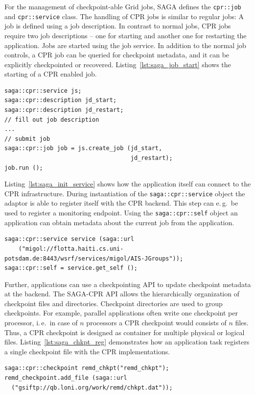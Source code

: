 \documentclass[times, 10pt, twocolumn]{article}
\begin{document}
For the management of checkpoint-able Grid jobs, SAGA defines the \texttt{cpr::job} and \texttt{cpr::service} class. The handling of 
CPR jobs is similar to regular jobs: A job is defined using a job description. In contrast to normal jobs, 
CPR jobs require  two job descriptions -- one for starting and another one for restarting the application.
Jobs are started using the job service. In addition to the normal job controls, a CPR job can be queried for checkpoint metadata, and 
it can be explicitly checkpointed or recovered. Listing~\ref{lst:saga_job_start} shows the starting of a CPR enabled job.


\begin{lstlisting}[style=myListing, caption={\small \bf SAGA-CPR: Starting a Job}, float=t, label={lst:saga_job_start}]
saga::cpr::service js; 
saga::cpr::description jd_start;
saga::cpr::description jd_restart;
// fill out job description
...
// submit job  
saga::cpr::job job = js.create_job (jd_start, 
                                    jd_restart);
job.run ();
\end{lstlisting}

Listing~\ref{lst:saga_init_service} shows how the application itself can connect to the CPR infrastructure. During instantiation of the \texttt{saga::cpr::service} object the adaptor is able to register itself with the CPR backend. This step can e.\,g.\ be used to register a monitoring endpoint. Using the \texttt{saga::cpr::self} object an application can obtain metadata about the current job from the application.                                                                               
\begin{lstlisting}[style=myListing, caption={\small \bf SAGA-CPR: Initialize Migol Session}, float=t, label={lst:saga_init_service}]
saga::cpr::service service (saga::url 
    ("migol://flotta.haiti.cs.uni-potsdam.de:8443/wsrf/services/migol/AIS-JGroups"));
saga::cpr::self = service.get_self ();
\end{lstlisting}

Further, applications can use a checkpointing API to update checkpoint metadata at the backend. The SAGA-CPR API allows the hierarchically 
organization of checkpoint files and directories. Checkpoint directories are 
used to group checkpoints. For example, parallel applications often write one checkpoint per 
processor, i.\,e.\ in case of $n$ processors a CPR checkpoint
would consists of $n$ files. Thus, a CPR checkpoint is designed as container 
for multiple physical or logical files. Listing~\ref{lst:saga_chkpt_reg} demonstrates 
how an application task registers a single checkpoint file with the CPR implementations.     
\begin{lstlisting}[style=myListing, caption={\small \bf SAGA-CPR: Register Checkpoint with Migol}, float=t, label={lst:saga_chkpt_reg}]
saga::cpr::checkpoint remd_chkpt("remd_chkpt");
remd_checkpoint.add_file (saga::url 
  ("gsiftp://qb.loni.org/work/remd/chkpt.dat"));
\end{lstlisting}
\end{document}
